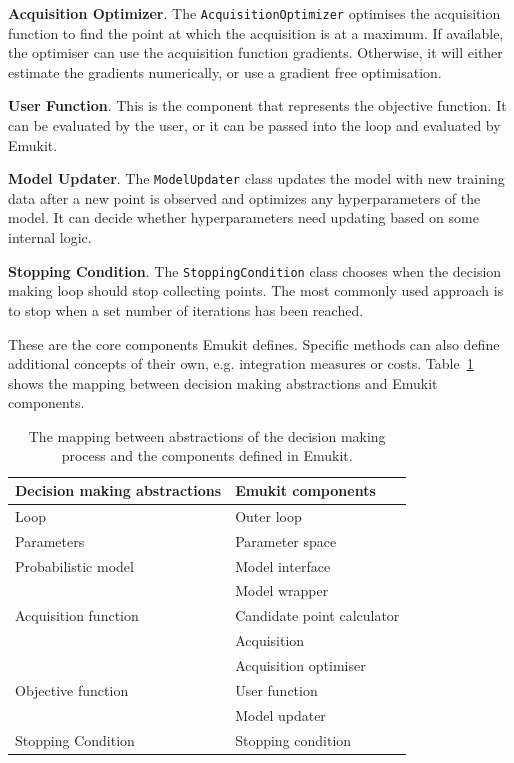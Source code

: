 \textbf{Acquisition Optimizer}. The \texttt{AcquisitionOptimizer} optimises the acquisition function to find the point at which the acquisition is at a maximum. If available, the optimiser can use the acquisition function gradients. Otherwise, it will either estimate the gradients numerically, or use a gradient free optimisation.

\textbf{User Function}. This is the component that represents the objective function. It can be evaluated by the user, or it can be passed into the loop and evaluated by Emukit.

\textbf{Model Updater}. The \texttt{ModelUpdater} class updates the model with new training data after a new point is observed and optimizes any hyperparameters of the model. It can decide whether hyperparameters need updating based on some internal logic.

\textbf{Stopping Condition}. The \texttt{StoppingCondition} class chooses when the decision making loop should stop collecting points. The most commonly used approach is to stop when a set number of iterations has been reached.

These are the core components Emukit defines. Specific methods can also define additional concepts of their own, e.g. integration measures or costs. Table~\ref{table:abstraction_mapping} shows the mapping between decision making abstractions and Emukit components.

\begin{table}
    \setlength{\DUtablewidth}{\tablewidth}
    \begin{longtable}[c]{p{0.4\DUtablewidth}p{0.4\DUtablewidth}}
        \toprule
        \textbf{Decision making abstractions} & \textbf{Emukit components} \\
        \midrule
        \endfirsthead
        Loop & Outer loop \\
        \midrule
        Parameters & Parameter space \\
        Probabilistic model & Model interface \\
        & Model wrapper \\
        \midrule
        Acquisition function & Candidate point calculator \\
        & Acquisition \\
        & Acquisition optimiser \\
        \midrule
        Objective function & User function \\
        & Model updater \\
        \midrule
        Stopping Condition & Stopping condition \\
        \bottomrule
    \end{longtable}
    \caption{The mapping between abstractions of the decision making process and the components defined in Emukit.}
    \label{table:abstraction_mapping}
\end{table}

